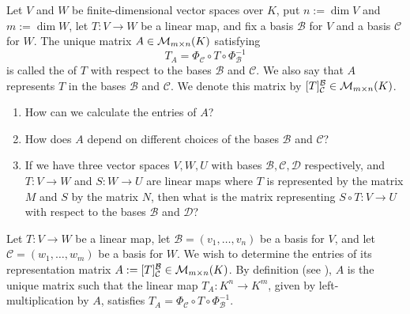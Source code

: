 \begin{definition*}
\label{def:representation_matrix}
Let $V$ and $W$ be finite-di\-men\-sional vector spaces over $K$, put $n := \dim V$ and $m := \dim W$, let $T: V \to W$ be a linear map, and fix a basis $\mathcal{B}$ for $V$ and a basis $\mathcal{C}$ for $W$. The unique matrix $A \in \mathcal{M}_{m \times n}(K)$ satisfying
\[
T_A = \Phi_{\mathcal{C}} \circ T \circ \Phi_{\mathcal{B}}^{-1}
\]
is called the  of $T$ with respect to the bases $\mathcal{B}$ and $\mathcal{C}$. We also say that $A$ represents $T$ in the bases $\mathcal{B}$ and $\mathcal{C}$. We denote this matrix by $[T]_{\mathcal{C}}^{\mathcal{B}} \in \mathcal{M}_{m \times n}(K)$.
\end{definition*}

\begin{question}
\begin{enumerate}
    \item How can we calculate the entries of $A$?
    \item How does $A$ depend on different choices of the bases $\mathcal{B}$ and $\mathcal{C}$?
    \item If we have three vector spaces $V, W, U$ with bases $\mathcal{B}, \mathcal{C}, \mathcal{D}$ respectively, and $T: V \to W$ and $S: W \to U$ are linear maps where $T$ is represented by the matrix $M$ and $S$ by the matrix $N$, then what is the matrix representing $S \circ T: V \to U$ with respect to the bases $\mathcal{B}$ and $\mathcal{D}$?
\end{enumerate}
\end{question}

Let $T: V \to W$ be a linear map, let $\mathcal{B} = (v_1, \dots, v_n)$ be a basis for $V$, and let $\mathcal{C} = (w_1, \dots, w_m)$ be a basis for $W$. We wish to determine the entries of its representation matrix $A := [T]_{\mathcal{C}}^{\mathcal{B}} \in \mathcal{M}_{m \times n}(K)$. By definition (see ), $A$ is the unique matrix such that the linear map $T_A: K^n \to K^m$, given by left-multiplication by $A$, satisfies $T_A = \Phi_{\mathcal{C}} \circ T \circ \Phi_{\mathcal{B}}^{-1}$.

